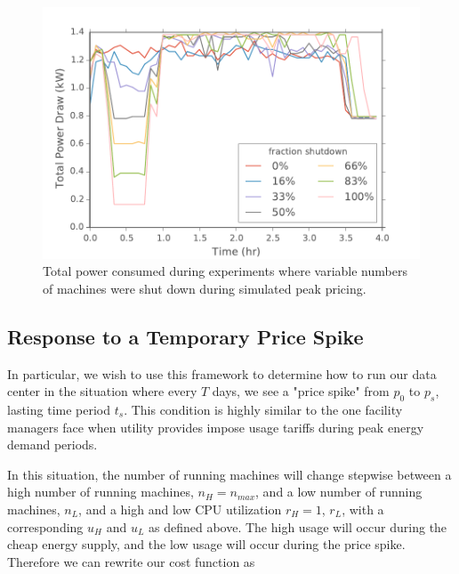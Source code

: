 \begin{figure}[t]
	\begin{center}
		\includegraphics[scale=0.55]{edeals/power_viz}
	\end{center}
	\caption{Total power consumed during experiments where variable numbers of machines were shut down during simulated peak pricing.}
	\label{power_viz}
\end{figure}

\subsection{Response to a Temporary Price Spike}

In particular, we wish to use this framework to determine how to run our data center in the situation where every $T$ days, we see a "price spike" from $p_0$ to $p_s$, lasting time period $t_s$.  This condition is highly similar to the one facility managers face when utility provides impose usage tariffs during peak energy demand periods.

In this situation, the number of running machines will change stepwise between a high number of running machines, $n_H=n_{max}$, and a low number of running machines, $n_L$, and a high and low CPU utilization $r_H=1$, $r_L$, with a corresponding $u_H$ and $u_L$ as defined above.  The high usage will occur during the cheap energy supply, and the low usage will occur during the price spike.  Therefore we can rewrite our cost function as 

